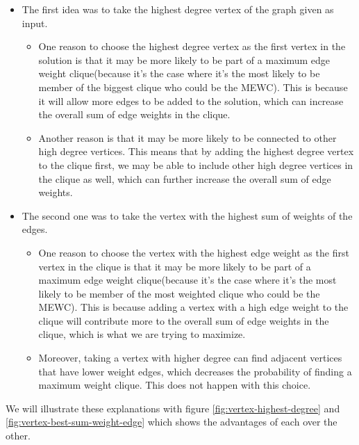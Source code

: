 \begin{itemize}
    \item The first idea was to take the highest degree vertex of the graph given as input.
          \begin{itemize}
              \item One reason to choose the highest degree vertex as the first vertex in the solution is that it may be more likely to be part of a maximum edge weight clique(because it's the case where it's the most likely to be member of the biggest clique who could be the MEWC). This is because it will allow more edges to be added to the solution, which can increase the overall sum of edge weights in the clique.
              \item Another reason is that it may be more likely to be connected to other high degree vertices. This means that by adding the highest degree vertex to the clique first, we may be able to include other high degree vertices in the clique as well, which can further increase the overall sum of edge weights.
          \end{itemize}
    \item The second one was to take the vertex with the highest sum of weights of the edges.
          \begin{itemize}
              \item One reason to choose the vertex with the highest edge weight as the first vertex in the clique is that it may be more likely to be part of a maximum edge weight clique(because it's the case where it's the most likely to be member of the most weighted clique who could be the MEWC). This is because adding a vertex with a high edge weight to the clique will contribute more to the overall sum of edge weights in the clique, which is what we are trying to maximize.
              \item Moreover, taking a vertex with higher degree can find adjacent vertices that have lower weight edges, which decreases the probability of finding a maximum weight clique. This does not happen with this choice.
          \end{itemize}
\end{itemize}

\vspace{1\baselineskip}

We will illustrate these explanations with figure \ref{fig:vertex-highest-degree} and \ref{fig:vertex-best-sum-weight-edge} which shows the advantages of each over the other.
\bigskip

